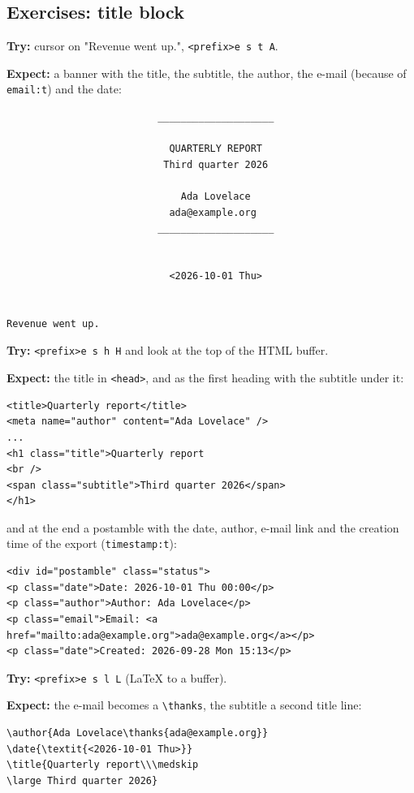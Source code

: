 \subsection{Exercises: title block}
\label{sec:orgae84143}
\textbf{Try:} cursor on "Revenue went up.", \texttt{<prefix>e s t A}.

\textbf{Expect:} a banner with the title, the subtitle, the author, the e-mail
(because of \texttt{email:t}) and the date:

\begin{verbatim}
                          ____________________

                            QUARTERLY REPORT
                           Third quarter 2026

                              Ada Lovelace
                            ada@example.org
                          ____________________


                            <2026-10-01 Thu>


Revenue went up.
\end{verbatim}

\textbf{Try:} \texttt{<prefix>e s h H} and look at the top of the HTML buffer.

\textbf{Expect:} the title in \texttt{<head>}, and as the first heading with the
subtitle under it:

\begin{verbatim}
<title>Quarterly report</title>
<meta name="author" content="Ada Lovelace" />
...
<h1 class="title">Quarterly report
<br />
<span class="subtitle">Third quarter 2026</span>
</h1>
\end{verbatim}

and at the end a postamble with the date, author, e-mail link and the
creation time of the export (\texttt{timestamp:t}):

\begin{verbatim}
<div id="postamble" class="status">
<p class="date">Date: 2026-10-01 Thu 00:00</p>
<p class="author">Author: Ada Lovelace</p>
<p class="email">Email: <a href="mailto:ada@example.org">ada@example.org</a></p>
<p class="date">Created: 2026-09-28 Mon 15:13</p>
\end{verbatim}

\textbf{Try:} \texttt{<prefix>e s l L} (\LaTeX{} to a buffer).

\textbf{Expect:} the e-mail becomes a \texttt{\textbackslash{}thanks}, the subtitle a second title line:

\begin{verbatim}
\author{Ada Lovelace\thanks{ada@example.org}}
\date{\textit{<2026-10-01 Thu>}}
\title{Quarterly report\\\medskip
\large Third quarter 2026}
\end{verbatim}

